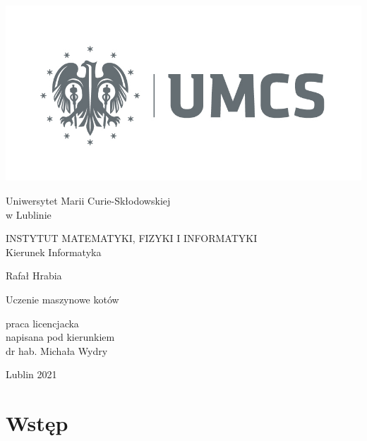 \documentclass[12pt,oneside,a4paper]{article} %
\begin{document}
\thispagestyle{empty}
\begin{center}
\includegraphics[scale=0.2]{umcs_logo}
\end{center}

\begin{center}{\sc \Large
Uniwersytet Marii Curie-Skłodowskiej\\
w Lublinie}\par\vspace{0.2cm}\par
{\large
INSTYTUT MATEMATYKI, FIZYKI I INFORMATYKI\\
Kierunek Informatyka
}
\end{center}
\vspace{5cm}
\begin{center}
{\large
Rafał Hrabia
}\par\vspace{0.2cm}\par
{\LARGE
Uczenie maszynowe kotów
}
\end{center}
\vspace{4cm}
\begin{flushright}
praca licencjacka\\
napisana pod kierunkiem\\
dr hab. Michała Wydry
\end{flushright}
\vfill
\begin{center}
Lublin 2021
\end{center}

\newpage
\tableofcontents
\newpage

\section{Wstęp}
\lipsum[1-3]
\end{document}
